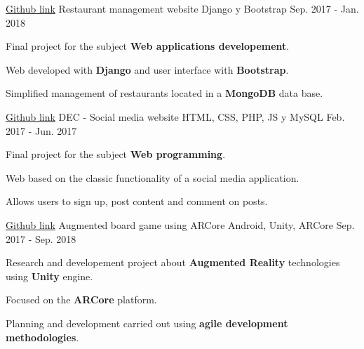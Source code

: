 

\begin{cventries}

  \cventry
  {\href{https://github.com/matl1995/DAI}{Github link}} %
  {Restaurant management website} %
  {Django y Bootstrap} %
  {Sep. 2017 - Jan. 2018} %
  {
    \begin{cvitems} %
      \item {Final project for the subject \textbf{Web applications developement}.}
      \item {Web developed with \textbf{Django} and user interface with \textbf{Bootstrap}.}
      \item {Simplified management of restaurants located in a \textbf{MongoDB} data base.}
    \end{cvitems}
  }

  \cventry
  {\href{https://github.com/matl1995/PW}{Github link}} %
  {DEC - Social media website} %
  {HTML, CSS, PHP, JS y MySQL} %
  {Feb. 2017 - Jun. 2017} %
  {
    \begin{cvitems} %
      \item {Final project for the subject \textbf{Web programming}.}
      \item {Web based on the classic functionality of a social media application.}
      \item {Allows users to sign up, post content and comment on posts.}
    \end{cvitems}
  }

  \cventry
    {\href{https://github.com/matl1995/TFG}{Github link}} %
    {Augmented board game using ARCore} %
    {Android, Unity, ARCore} %
    {Sep. 2017 - Sep. 2018} %
    {
      \begin{cvitems} %
        \item {Research and developement project about \textbf{Augmented Reality} technologies using \textbf{Unity} engine.}
        \item {Focused on the \textbf{ARCore} platform.}
        \item {Planning and development carried out using \textbf{agile development methodologies}.}
      \end{cvitems}
    }


\end{cventries}
